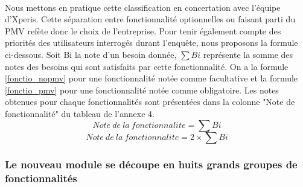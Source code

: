 			\paragraph{}%
			Nous mettons en pratique cette classification en concertation avec l'équipe
			d'Xperis. Cette séparation entre fonctionnalité optionnelles ou faisant parti
			du PMV refète donc le choix de l'entreprise. Pour tenir également compte des
			priorités des utilisateurs interrogés durant l'enquête, nous proposons la
			formule ci-dessous. Soit Bi la note d'un besoin donnée,
			\begin{math}\sum Bi\end{math} représente la somme des notes des besoins qui
			sont satisfaits par cette fonctionnalité. On a la formule \ref{fonctio_nopmv}
			pour une fonctionnalité notée comme facultative et la formule
			\ref{fonctio_pmv} pour une fonctionnalité notée comme obligatoire. Les notes
			obtenues pour chaque fonctionnalités sont présentées dans la colonne "Note
			de fonctionnalité" du tableau de l'annexe 4.
			\begin{equation}
				\label{fonctio_nopmv}
				Note\ de\ la\ fonctionnalite=\sum Bi
			\end{equation}
			\begin{equation}
				\label{fonctio_pmv}
				Note\ de\ la\ fonctionnalite=2\times \sum Bi
			\end{equation}
			
		\subsubsection{Le nouveau module se découpe en huits grands groupes de
		fonctionnalités}

